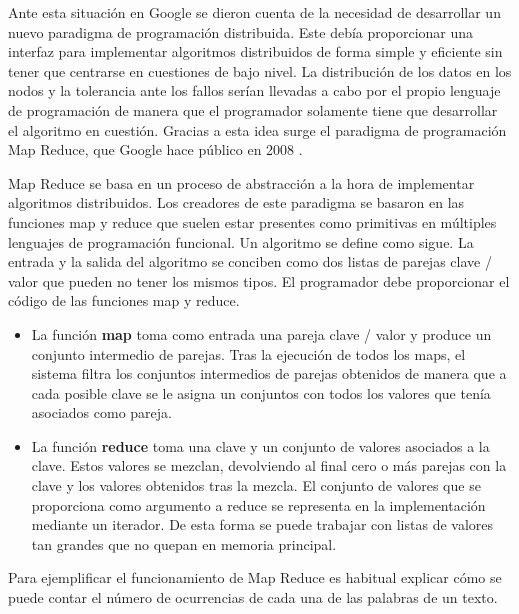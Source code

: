 \documentclass[10pt]{article}
\begin{document}
		Ante esta situación en Google se dieron cuenta de la necesidad de desarrollar un nuevo paradigma de programación distribuida. Este debía proporcionar una interfaz para implementar algoritmos distribuidos de forma simple y eficiente sin tener que centrarse en cuestiones de bajo nivel. La distribución de los datos en los nodos y la tolerancia ante los fallos serían llevadas a cabo por el propio lenguaje de programación de manera que el programador solamente tiene que desarrollar el algoritmo en cuestión. Gracias a esta idea surge el paradigma de programación Map Reduce, que Google hace público en 2008 \cite{map-reduce1, map-reduce2, map-reduce3}.
	
		Map Reduce se basa en un proceso de abstracción a la hora de implementar algoritmos distribuidos. Los creadores de este paradigma se basaron en las funciones map y reduce que suelen estar presentes como primitivas en múltiples lenguajes de programación funcional. Un algoritmo se define como sigue. La entrada y la salida del algoritmo se conciben como dos listas de parejas clave / valor que pueden no tener los mismos tipos. El programador debe proporcionar el código de las funciones map y reduce.
		
		\begin{itemize}
			\item La función \textbf{map} toma como entrada una pareja clave / valor y produce un conjunto intermedio de parejas. Tras la ejecución de todos los maps, el sistema filtra los conjuntos intermedios de parejas obtenidos de manera que a cada posible clave se le asigna un conjuntos con todos los valores que tenía asociados como pareja.
			\item La función \textbf{reduce} toma una clave y un conjunto de valores asociados a la clave. Estos valores se mezclan, devolviendo al final cero o más parejas con la clave y los valores obtenidos tras la mezcla. El conjunto de valores que se proporciona como argumento a reduce se representa en la implementación mediante un iterador. De esta forma se puede trabajar con listas de valores tan grandes que no quepan en memoria principal.
		\end{itemize}  
		
		Para ejemplificar el funcionamiento de Map Reduce es habitual explicar cómo se puede contar el número de ocurrencias de cada una de las palabras de un texto. 
		
\end{document}
